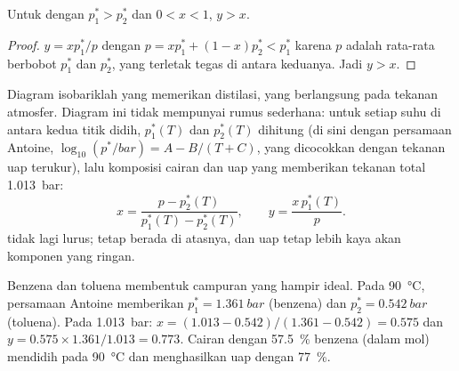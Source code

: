 \begin{proposition}\label{prop:b2:liquid-vapour-diagrams:richer}
Untuk  dengan $p_1^* > p_2^*$ dan $0 < x < 1$, $y > x$.
\end{proposition}

\begin{proof}
$y = xp_1^*/p$ dengan $p = xp_1^* + (1 - x)p_2^* < p_1^*$ karena $p$ adalah
rata-rata berbobot $p_1^*$ dan $p_2^*$, yang terletak tegas di antara
keduanya. Jadi $y >
x$.
\end{proof}

Diagram isobariklah yang memerikan distilasi, yang berlangsung pada tekanan
atmosfer. Diagram ini tidak mempunyai rumus sederhana: untuk setiap suhu
di antara kedua titik didih, $p_1^*(T)$ dan $p_2^*(T)$ dihitung (di sini
dengan persamaan Antoine, $\log_{10}(p^*/\unit{bar}) = A - B/(T + C)$, yang
dicocokkan dengan tekanan uap terukur), lalu komposisi cairan dan uap yang
memberikan tekanan total \qty{1.013}{bar}:
\[
  x = \frac{p - p_2^*(T)}{p_1^*(T) - p_2^*(T)}, \qquad y = \frac{x\,p_1^*(T)}{p} .
\]
 tidak lagi lurus;  tetap berada di atasnya,
dan uap tetap lebih kaya akan komponen yang ringan.

\begin{example}\label{ex:b2:liquid-vapour-diagrams:benzene-toluene}
Benzena dan toluena membentuk campuran yang hampir ideal. Pada
\qty{90}{\degreeCelsius}, persamaan Antoine memberikan
$p_1^* = \qty{1.361}{bar}$ (benzena) dan $p_2^* =
\qty{0.542}{bar}$
(toluena). Pada \qty{1.013}{bar}: $x = (1.013 - 0.542)/(1.361 -
0.542) = 0.575$ dan $y = 0.575 \times 1.361/1.013 = 0.773$. Cairan dengan
57.5~\% benzena (dalam mol) mendidih pada \qty{90}{\degreeCelsius} dan
menghasilkan uap dengan 77~\%.
\end{example}

